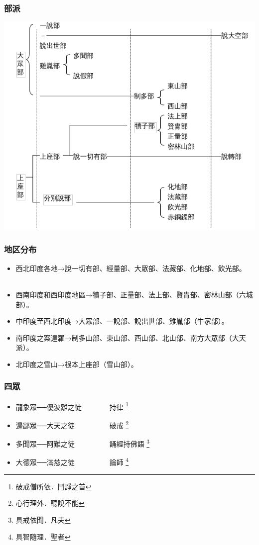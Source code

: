 \subsubsection{部派}
\includegraphics[scale=0.5]{Buddhism/images/部派佛教分化.png}

\subsubsection{地区分布}
\begin{itemize}
  \item 西北印度各地→說一切有部、經量部、大眾部、法藏部、化地部、飲光部。
　\item 西南印度和西印度地區→犢子部、正量部、法上部、賢胄部、密林山部（六城部）。
　\item 中印度至西北印度→大眾部、一說部、說出世部、雞胤部（牛家部）。
　\item 南印度之案達羅→制多山部、東山部、西山部、北山部、南方大眾部（大天派）。
　\item 北印度之雪山→根本上座部（雪山部）。
\end{itemize}

\subsubsection{四眾}
\begin{itemize}
  \item 龍象眾──優波離之徒　　　　持律 \footnote{破戒僧所依．鬥諍之首}
	\item 邊鄙眾──大天之徒　　　　　破戒 \footnote{心行理外．聽說不能}
	\item 多聞眾──阿難之徒　　　　　誦經持佛語 \footnote{具戒依聞．凡夫}
	\item 大德眾──滿慈之徒　　　　　論師 \footnote{具智隨理．聖者}
\end{itemize}

